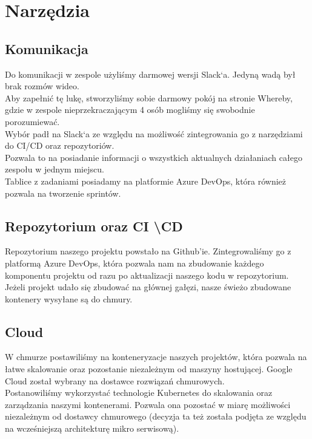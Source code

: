 \documentclass[a4paper,11pt]{report}
\begin{document}
 
\section{Narzędzia}
\subsection {Komunikacja}
Do komunikacji w zespole użyliśmy darmowej wersji Slack`a. Jedyną wadą był brak rozmów wideo.\\
Aby zapełnić tę lukę, stworzyliśmy sobie darmowy pokój na stronie Whereby, gdzie w zespole nieprzekraczającym 4
osób mogliśmy się swobodnie porozumiewać.\\
Wybór padł na Slack`a ze względu na możliwość zintegrowania go z narzędziami do CI/CD oraz repozytoriów.\\
Pozwala to na posiadanie informacji o wszystkich aktualnych działaniach całego zespołu w jednym miejscu.\\
Tablice z zadaniami posiadamy na platformie Azure DevOps, która również pozwala na tworzenie sprintów.\\
\subsection{Repozytorium oraz CI \textbackslash CD}
Repozytorium naszego projektu powstało na Github'ie. Zintegrowaliśmy go z platformą Azure DevOps, 
która pozwala nam na zbudowanie każdego komponentu projektu od razu po aktualizacji naszego kodu w repozytorium.\\
Jeżeli projekt udało się zbudować na głównej gałęzi, nasze świeżo zbudowane kontenery wysyłane są do chmury.\\
\subsection{Cloud}
W chmurze postawiliśmy na konteneryzacje naszych projektów, która pozwala na łatwe
skalowanie oraz pozostanie niezależnym od maszyny hostującej. Google Cloud został wybrany na dostawce rozwiązań chmurowych.\\
Postanowiliśmy wykorzystać technologie Kubernetes do skalowania oraz zarządzania naszymi kontenerami. Pozwala ona pozostać w miarę możliwości
niezależnym od dostawcy chmurowego (decyzja ta też została podjęta ze względu na wcześniejszą architekturę mikro serwisową).
\end{document}
